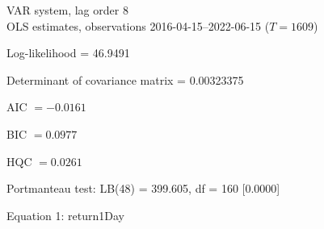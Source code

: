 \begin{center}
VAR system, lag order 8\\
OLS estimates, observations 2016-04-15--2022-06-15 ($T=1609$)
\end{center}
\noindent
Log-likelihood = 46.9491\par
\noindent
Determinant of covariance matrix = 0.00323375\par
\noindent
AIC $= -0.0161$ \par
\noindent
BIC $= 0.0977$ \par
\noindent
HQC $= 0.0261$ \par
\noindent
Portmanteau test: LB(48) = 399.605, df = 160 [0.0000]\par
\begin{center}

Equation 1: return1Day\\


\end{center}
